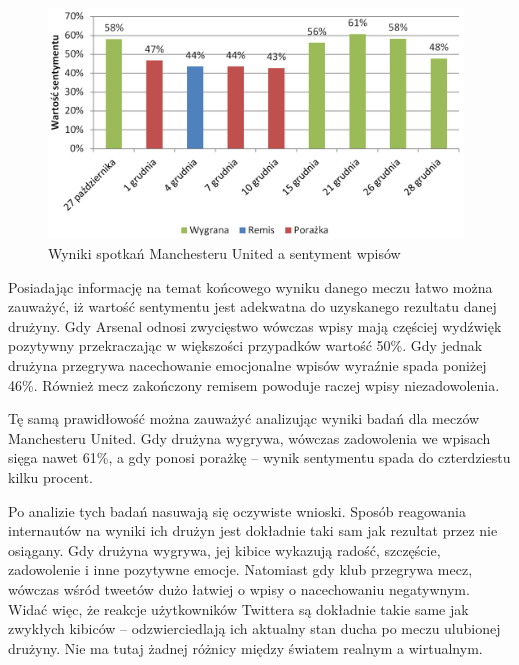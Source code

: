 \begin{figure}[ht!]
\centering
\includegraphics[width=110mm]{img/pozytywnosc-munited2.png}
\caption{Wyniki spotkań Manchesteru United a sentyment wpisów}
\label{image:pozytywnosc-munited}
\end{figure}

Posiadając informację na temat końcowego wyniku danego meczu łatwo można 
zauważyć, iż wartość sentymentu jest adekwatna do uzyskanego rezultatu danej 
drużyny. Gdy Arsenal odnosi zwycięstwo wówczas wpisy mają częściej wydźwięk
pozytywny przekraczając w większości przypadków wartość 50\%. Gdy jednak 
drużyna przegrywa nacechowanie emocjonalne wpisów wyraźnie spada poniżej 46\%.
Również mecz zakończony remisem powoduje raczej wpisy niezadowolenia.
 
Tę samą prawidłowość można zauważyć analizując wyniki badań dla meczów
Manchesteru United. Gdy drużyna wygrywa, wówczas zadowolenia we wpisach sięga
nawet 61\%, a gdy ponosi porażkę -- wynik sentymentu spada do czterdziestu kilku
procent.

Po analizie tych badań nasuwają się oczywiste wnioski. Sposób reagowania
internautów na wyniki ich drużyn jest dokładnie taki sam jak rezultat przez nie
osiągany. Gdy drużyna wygrywa, jej kibice wykazują radość, szczęście,
zadowolenie i inne pozytywne emocje.
Natomiast gdy klub przegrywa mecz, wówczas wśród tweetów dużo łatwiej o wpisy o
nacechowaniu negatywnym. Widać więc, że reakcje użytkowników Twittera są
dokładnie takie same jak zwykłych kibiców -- odzwierciedlają ich aktualny stan
ducha po meczu ulubionej drużyny. Nie ma tutaj żadnej różnicy między światem
realnym a wirtualnym.
















